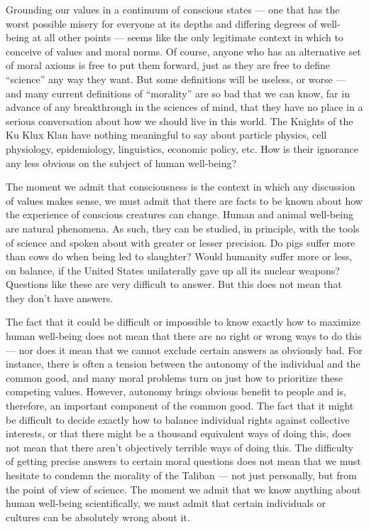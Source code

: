 \documentclass[a4paper,14pt]{extbook}
\begin{document}
Grounding our values in a continuum of conscious states --- one that has the worst possible misery for everyone at its depths and differing degrees of well-being at all other points --- seems like the only legitimate context in which to conceive of values and moral norms.
Of course, anyone who has an alternative set of moral axioms is free to put them forward, just as they are free to define ``science'' any way they want.
But some definitions will be useless, or worse --- and many current definitions of ``morality'' are so bad that we can know, far in advance of any breakthrough in the sciences of mind, that they have no place in a serious conversation about how we should live in this world.
The Knights of the Ku Klux Klan have nothing meaningful to say about particle physics, cell physiology, epidemiology, linguistics, economic policy, etc.
How is their ignorance any less obvious on the subject of human well-being?

The moment we admit that consciousness is the context in which any discussion of values makes sense, we must admit that there are facts to be known about how the experience of conscious creatures can change.
Human and animal well-being are natural phenomena.
As such, they can be studied, in principle, with the tools of science and spoken about with greater or lesser precision.
Do pigs suffer more than cows do when being led to slaughter?
Would humanity suffer more or less, on balance, if the United States unilaterally gave up all its nuclear weapons?
Questions like these are very difficult to answer.
But this does not mean that they don't have answers.

The fact that it could be difficult or impossible to know exactly how to maximize human well-being does not mean that there are no right or wrong ways to do this --- nor does it mean that we cannot exclude certain answers as obviously bad.
For instance, there is often a tension between the autonomy of the individual and the common good, and many moral problems turn on just how to prioritize these competing values.
However, autonomy brings obvious benefit to people and is, therefore, an important component of the common good.
The fact that it might be difficult to decide exactly how to balance individual rights against collective interests, or that there might be a thousand equivalent ways of doing this, does not mean that there aren't objectively terrible ways of doing this.
The difficulty of getting precise answers to certain moral questions does not mean that we must hesitate to condemn the morality of the Taliban --- not just personally, but from the point of view of science.
The moment we admit that we know anything about human well-being scientifically, we must admit that certain individuals or cultures can be absolutely wrong about it.
\end{document}
